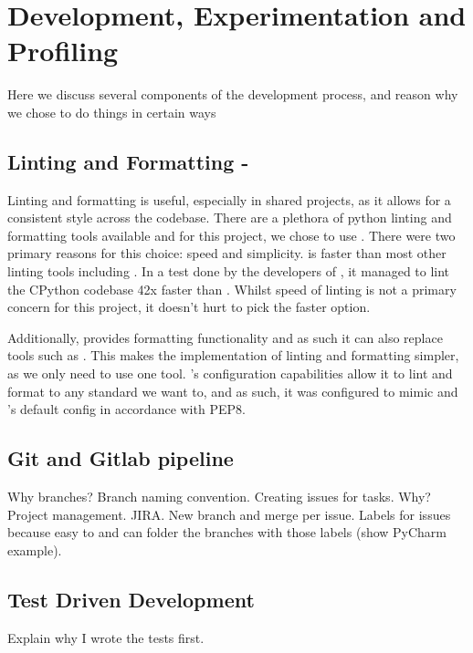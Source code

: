 
\section{Development, Experimentation and Profiling}\label{sec:development-experimentation-and-profiling}
Here we discuss several components of the development process, and reason why we chose to do things in certain ways

\subsection{Linting and Formatting - }\label{subsec:linting-and-formatting}
    Linting and formatting is useful, especially in shared projects, as it allows for a consistent style across the codebase.
    There are a plethora of python linting and formatting tools available and for this project, we chose to use .
    There were two primary reasons for this choice: speed and simplicity.
     is faster than most other linting tools including .
    In a test done by the developers of , it managed to lint the CPython codebase 42x faster than
     \cite{ruff-repo}.
    Whilst speed of linting is not a primary concern for this project, it doesn't hurt to pick the faster option.

    Additionally,  provides formatting functionality and as such it can also replace tools such as
    .
    This makes the implementation of linting and formatting simpler, as we only need to use one tool.
    's configuration capabilities allow it to lint and format to any standard we want to, and as such,
    it was configured to mimic  and 's default config in accordance with PEP8.

    \subsection{Git and Gitlab pipeline}\label{subsec:git-and-gitlab-pipeline}
    Why branches? Branch naming convention.
    Creating issues for tasks. Why? Project management. JIRA.
    New branch and merge per issue.
    Labels for issues because easy to and can folder the branches with those labels (show PyCharm example).

    \subsection{Test Driven Development}\label{subsec:test-driven-development}
    Explain why I wrote the tests first.

